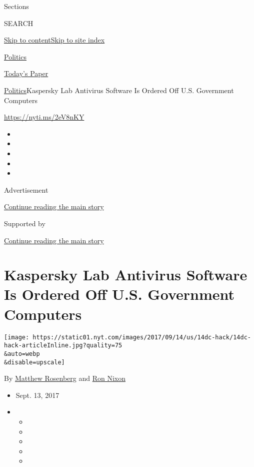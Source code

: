 Sections

SEARCH

\protect\hyperlink{site-content}{Skip to
content}\protect\hyperlink{site-index}{Skip to site index}

\href{https://www.nytimes.com/section/politics}{Politics}

\href{https://myaccount.nytimes.com/auth/login?response_type=cookie\&client_id=vi}{}

\href{https://www.nytimes.com/section/todayspaper}{Today's Paper}

\href{/section/politics}{Politics}\textbar{}Kaspersky Lab Antivirus
Software Is Ordered Off U.S. Government Computers

\url{https://nyti.ms/2eV8nKY}

\begin{itemize}
\item
\item
\item
\item
\item
\end{itemize}

Advertisement

\protect\hyperlink{after-top}{Continue reading the main story}

Supported by

\protect\hyperlink{after-sponsor}{Continue reading the main story}

\hypertarget{kaspersky-lab-antivirus-software-is-ordered-off-us-government-computers}{%
\section{Kaspersky Lab Antivirus Software Is Ordered Off U.S. Government
Computers}\label{kaspersky-lab-antivirus-software-is-ordered-off-us-government-computers}}

\texttt{[image: https://static01.nyt.com/images/2017/09/14/us/14dc-hack/14dc-hack-articleInline.jpg?quality=75\\\&auto=webp\\\&disable=upscale]}

By \href{http://www.nytimes.com/by/matthew-rosenberg}{Matthew Rosenberg}
and \href{http://www.nytimes.com/by/ron-nixon}{Ron Nixon}

\begin{itemize}
\item
  Sept. 13, 2017
\item
  \begin{itemize}
  \item
  \item
  \item
  \item
  \item
  \end{itemize}
\end{itemize}

